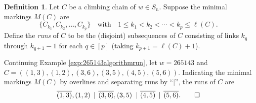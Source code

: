 \documentclass[11pt]{amsart}
\theoremstyle{definition}
\newtheorem{definition}[theorem]{Definition}
\newenvironment{example}
{\pushQED{\qed}\renewcommand{\qedsymbol}{$\diamondsuit$}\examplex}
{\popQED\endexamplex}
\theoremstyle{named}
\begin{document}
	\begin{definition}
		Let $C$ be a climbing chain of $w\in S_n$. Suppose the minimal markings $M(C)$ are 
		\[\{C_{k_1},C_{k_2},\ldots,C_{k_p}\}\quad \mbox{with}\quad 1\leq k_1<k_2<\cdots<k_p\leq \ell(C).\]
		Define the \emph{runs} of $C$ to be the (disjoint) subsequences of $C$ consisting of links $k_q$ through $k_{q+1}-1$ for each $q\in [p]$ (taking $k_{p+1}=\ell(C)+1$).
	\end{definition}
	
	\begin{example}
		\label{exp:265143links}
		Continuing Example \ref{exp:265143algorithmrun}, let $w=265143$ and $C=((1,3),(1,2),(3,6),(3,5),(4,5),(5,6))$. Indicating the minimal markings $M(C)$ by overlines and separating runs by ``$\mid$'', the runs of $C$ are
 		\[\overline{(1,3)},(1,2) \,\mid\, \overline{(3,6)},(3,5)\,\mid\, \overline{(4,5)} \,\mid\, \overline{(5,6)}.\qedhere\]
	\end{example}
	
\end{document}
